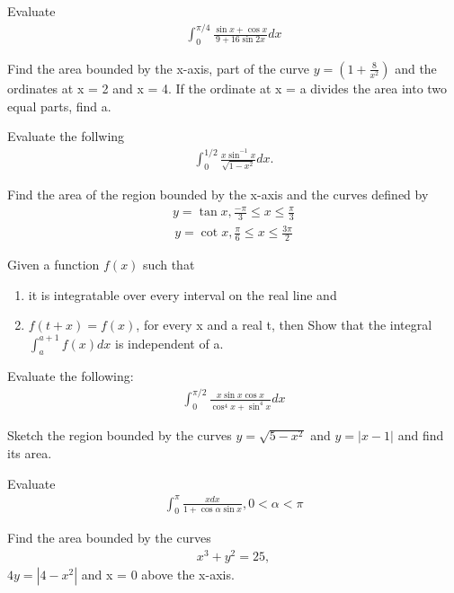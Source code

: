 \item Evaluate
\begin{align*}
\int_{0}^{\pi/4}\frac{\sin x + \cos x}{9 + 16\sin 2x}dx
\end{align*}

\item Find the area bounded by the x-axis, part of the curve $y = (1 + \frac{8}{x^2})$ and the ordinates at x = 2 and x = 4. If the ordinate at x = a divides the area into two equal parts, find a.

\item Evaluate the follwing
\begin{align*}
\int_{0}^{1/2}\frac{x\sin^{-1}x}{\sqrt{1 - x^2}}dx.
\end{align*}

\item Find the area of the region bounded by the x-axis and the curves defined by
\begin{align*}
y = \tan x, \frac{-\pi}{3} \leq x \leq \frac{\pi}{3}
\end{align*}
\begin{align*}
y = \cot x, \frac{\pi}{6} \leq x \leq \frac{3\pi}{2}
\end{align*}

\item Given a function $f(x)$ such that
\begin{enumerate}
\item it is integratable over every interval on the real line and
\item $f(t + x) = f(x)$, for every x and a real t, then Show that the integral $\int_{a}^{a + 1}f(x)dx$ is independent of a.
\end{enumerate}

\item Evaluate the following:
\begin{align*}
\int_{0}^{\pi/2}\frac{x\sin x \cos x}{\cos^{4}x + \sin^{4}x}dx
\end{align*}

\item Sketch the region bounded by the curves $y = \sqrt{5 - x^{2}}$ and $y = |x - 1|$ and find its area.

\item Evaluate
\begin{align*}
\int_{0}^{\pi}\frac{x dx}{1 + \cos \alpha \sin x}, 0 < \alpha < \pi
\end{align*}

\item Find the area bounded by the curves 
\begin{align}
x^3 + y^{2} = 25,
\end{align}
$4y = |4 - x^{2}|$ and x = 0 above the x-axis.

